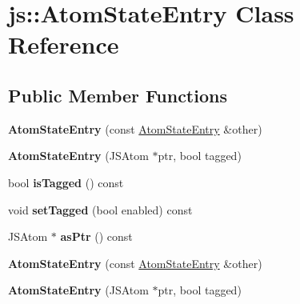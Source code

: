 \hypertarget{classjs_1_1_atom_state_entry}{\section{js\-:\-:Atom\-State\-Entry Class Reference}
\label{classjs_1_1_atom_state_entry}
}
\subsection*{Public Member Functions}
\begin{DoxyCompactItemize}
\item 
\hypertarget{classjs_1_1_atom_state_entry_a45f1d8f2b165d271b62f53904d8226f4}{{\bfseries Atom\-State\-Entry} (const \hyperlink{classjs_1_1_atom_state_entry}{Atom\-State\-Entry} \&other)}\label{classjs_1_1_atom_state_entry_a45f1d8f2b165d271b62f53904d8226f4}

\item 
\hypertarget{classjs_1_1_atom_state_entry_a1aa187e2f7c8eb6892d203357a6c778c}{{\bfseries Atom\-State\-Entry} (J\-S\-Atom $\ast$ptr, bool tagged)}\label{classjs_1_1_atom_state_entry_a1aa187e2f7c8eb6892d203357a6c778c}

\item 
\hypertarget{classjs_1_1_atom_state_entry_a74e1be45710b4c6a6145381d093a2ed1}{bool {\bfseries is\-Tagged} () const }\label{classjs_1_1_atom_state_entry_a74e1be45710b4c6a6145381d093a2ed1}

\item 
\hypertarget{classjs_1_1_atom_state_entry_a402d64ab6493f4c55abdc815c59f49c9}{void {\bfseries set\-Tagged} (bool enabled) const }\label{classjs_1_1_atom_state_entry_a402d64ab6493f4c55abdc815c59f49c9}

\item 
\hypertarget{classjs_1_1_atom_state_entry_abdf0400452a95ebb6172f18075422429}{J\-S\-Atom $\ast$ {\bfseries as\-Ptr} () const }\label{classjs_1_1_atom_state_entry_abdf0400452a95ebb6172f18075422429}

\item 
\hypertarget{classjs_1_1_atom_state_entry_a45f1d8f2b165d271b62f53904d8226f4}{{\bfseries Atom\-State\-Entry} (const \hyperlink{classjs_1_1_atom_state_entry}{Atom\-State\-Entry} \&other)}\label{classjs_1_1_atom_state_entry_a45f1d8f2b165d271b62f53904d8226f4}

\item 
\hypertarget{classjs_1_1_atom_state_entry_a1aa187e2f7c8eb6892d203357a6c778c}{{\bfseries Atom\-State\-Entry} (J\-S\-Atom $\ast$ptr, bool tagged)}\label{classjs_1_1_atom_state_entry_a1aa187e2f7c8eb6892d203357a6c778c}


\end{DoxyCompactItemize}
